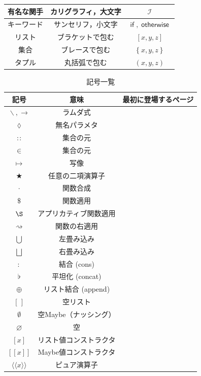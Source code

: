 \documentclass[a4paper]{jsbook}
\def\[{\left[\!\left[}
\def\]{\right]\!\right]}
\newcommand{\mSpecialFunctor}[1]{\mathcal{#1}} %
\newcommand{\mEmptyList}{{[\,]}}
\newcommand{\mNothing}{\emptyset}
\newcommand{\mPureNothing}{\varnothing}
\newcommand{\mKeyword}[1]{\mathsf{#1}}
\newcommand{\mIfKeyword}{\mKeyword{if}}
\newcommand{\mOtherwiseKeyword}{\mKeyword{otherwise}}
\newcommand{\mListWith}[1]{\left[#1\right]}
\newcommand{\mSetWith}[1]{\left\{#1\right\}}
\newcommand{\mTupleWith}[1]{\left(#1\right)}
\newcommand{\mMaybeWith}[1]{\[#1\]}
\newcommand{\mPureWith}[1]{\langle\!\langle#1\rangle\!\rangle}
\newcommand{\mAnonParameter}{\lozenge}
\DeclareMathOperator{\mLambda}{\backslash}
\DeclareMathOperator{\mLambdaArrow}{\rightarrow}
\DeclareMathOperator{\mIn}{{:\!:}}
\DeclareMathOperator{\mMapsTo}{\mapsto}
\DeclareMathOperator{\mBinOp}{\bigstar}
\DeclareMathOperator{\mComp}{\cdot}
\DeclareMathOperator{\mApply}{\$}
\DeclareMathOperator{\mApplyRight}{\rightsquigarrow}
\DeclareMathOperator*{\mFoldLeft}{\bigcup}
\DeclareMathOperator*{\mFoldRight}{\bigsqcup}
\DeclareMathOperator{\mCons}{:}
\DeclareMathOperator{\mConcat}{\flat}
\DeclareMathOperator{\mAppend}{\oplus}
\DeclareMathOperator{\mApplicativeApply}{\S}
\DeclareMathOperator{\mIFunctor}{\mSpecialFunctor{I}}
\DeclareMathOperator{\mIf}{\mIfKeyword}
\DeclareMathOperator{\mOtherwise}{\mOtherwiseKeyword}
\newcommand{\mathMaybeAppend}{\mathbin{\boxplus}}
\newcommand{\mathVarKeyword}[1]{\operatorname{\mathrm{#1}}}
\newcommand{\mathRest}{\mathVarKeyword{rest}}
\begin{document}
\begin{table}
\begin{center}
\begin{tabular}{||c|c|c||}
有名な関手&カリグラフィ，大文字&$\mIFunctor$\\
\hline
キーワード&サンセリフ，小文字&$\mIf,\mOtherwise$\\
\hline
リスト&ブラケットで包む&$\mListWith{x,y,z}$\\
集合&ブレースで包む&$\mSetWith{x,y,z}$\\
タプル&丸括弧で包む&$\mTupleWith{x,y,z}$\\
\hline
\end{tabular}
\end{center}
\end{table}

\begin{table}[p]
\caption{記号一覧}
\begin{center}
\begin{tabular}{||c|c|c||}
\hline
記号&意味&最初に登場するページ\\
\hline\hline
$\mLambda, \mLambdaArrow$&ラムダ式&\\
$\mAnonParameter$&無名パラメタ&\\
\hline
$\mIn$&集合の元&\\
$\in$&集合の元&\\
$\mMapsTo$&写像&\\\hline
$\mBinOp$&任意の二項演算子&\\
$\mComp$&関数合成&\\
$\mApply$&関数適用&\\
$\mApplicativeApply$&アプリカティブ関数適用&\\
$\mApplyRight$&関数の右適用&\\\hline
$\mFoldLeft$&左畳み込み&\\
$\mFoldRight$&右畳み込み&\\
\hline
$\mCons$&結合 (cons)&\\
$\mConcat$&平坦化 (concat)&\\
$\mAppend$&リスト結合 (append)&\\
\hline
$\mEmptyList$&空リスト&\\
$\mNothing$&空Maybe（ナッシング）&\\
$\mPureNothing$&空&\\\hline
$\mListWith{x}$&リスト値コンストラクタ&\\
$\mMaybeWith{x}$&Maybe値コンストラクタ&\\
$\mPureWith{x}$&ピュア演算子&\\

\end{tabular}
\end{center}
\end{table}
\end{document}
